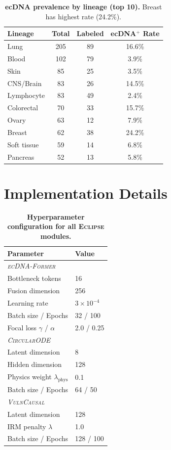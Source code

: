 \documentclass[runningheads]{llncs}
\newcommand{\eclipse}{\textsc{Eclipse}}
\newcommand{\former}{\textsc{ecDNA-Former}}
\newcommand{\circularode}{\textsc{CircularODE}}
\newcommand{\vulncausal}{\textsc{VulnCausal}}
\begin{document}
\begin{table}[h]
\caption{\textbf{ecDNA prevalence by lineage (top 10).} Breast has highest rate (24.2\%).}
\label{tab:lineage_prevalence}
\centering
\footnotesize
\begin{tabular}{@{}lccc@{}}
\toprule
Lineage & Total & Labeled & ecDNA$^+$ Rate \\
\midrule
Lung & 205 & 89 & 16.6\% \\
Blood & 102 & 79 & 3.9\% \\
Skin & 85 & 25 & 3.5\% \\
CNS/Brain & 83 & 26 & 14.5\% \\
Lymphocyte & 83 & 49 & 2.4\% \\
Colorectal & 70 & 33 & 15.7\% \\
Ovary & 63 & 12 & 7.9\% \\
Breast & 62 & 38 & 24.2\% \\
Soft tissue & 59 & 14 & 6.8\% \\
Pancreas & 52 & 13 & 5.8\% \\
\bottomrule
\end{tabular}
\end{table}


\section{Implementation Details}
\label{app:implementation}

\begin{table}[h]
\caption{\textbf{Hyperparameter configuration for all \eclipse{} modules.}}
\label{tab:hyperparams}
\centering
\footnotesize
\begin{tabular}{@{}ll@{}}
\toprule
\textbf{Parameter} & \textbf{Value} \\
\midrule
\multicolumn{2}{l}{\textit{\former{}}} \\
\quad Bottleneck tokens & 16 \\
\quad Fusion dimension & 256 \\
\quad Learning rate & $3 \times 10^{-4}$ \\
\quad Batch size / Epochs & 32 / 100 \\
\quad Focal loss $\gamma$ / $\alpha$ & 2.0 / 0.25 \\
\midrule
\multicolumn{2}{l}{\textit{\circularode{}}} \\
\quad Latent dimension & 8 \\
\quad Hidden dimension & 128 \\
\quad Physics weight $\lambda_{\text{phys}}$ & 0.1 \\
\quad Batch size / Epochs & 64 / 50 \\
\midrule
\multicolumn{2}{l}{\textit{\vulncausal{}}} \\
\quad Latent dimension & 128 \\
\quad IRM penalty $\lambda$ & 1.0 \\
\quad Batch size / Epochs & 128 / 100 \\
\bottomrule
\end{tabular}
\end{table}
\end{document}
